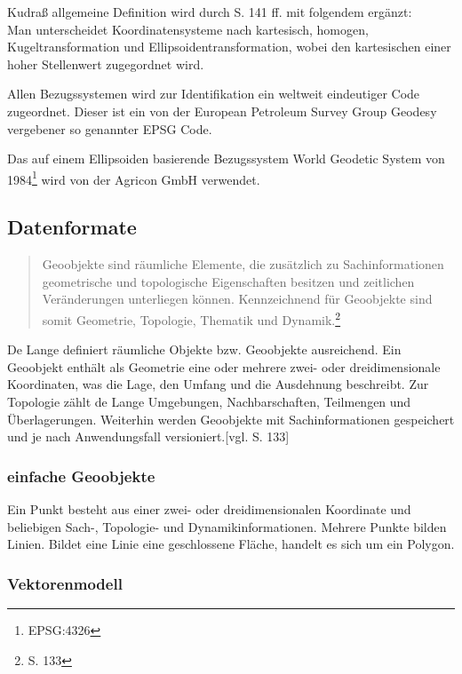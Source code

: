 Kudraß allgemeine Definition wird durch \cite{book:gi-theopluspraxis3} S. 141 ff. mit folgendem ergänzt:\\
Man unterscheidet Koordinatensysteme nach kartesisch, homogen, Kugeltransformation und Ellipsoidentransformation, wobei den kartesischen einer hoher Stellenwert zugegordnet wird.

Allen Bezugssystemen wird zur Identifikation ein weltweit eindeutiger Code zugeordnet.
Dieser ist ein von der European Petroleum Survey Group Geodesy vergebener so genannter EPSG Code.

Das auf einem Ellipsoiden basierende Bezugssystem World Geodetic System von 1984\footnote{EPSG:4326} wird von der Agricon GmbH verwendet.


\subsection{Datenformate}


\begin{quote}
Geoobjekte sind räumliche Elemente, die zusätzlich zu Sachinformationen geometrische und topologische Eigenschaften besitzen und zeitlichen Veränderungen unterliegen können. Kennzeichnend für Geoobjekte sind somit Geometrie, Topologie, Thematik und Dynamik.\footnote{\cite{book:gi-theopluspraxis3} S. 133}
\end{quote}
De Lange definiert räumliche Objekte bzw. Geoobjekte ausreichend.
Ein Geoobjekt enthält als Geometrie eine oder mehrere zwei- oder dreidimensionale Koordinaten, was die Lage, den Umfang und die Ausdehnung beschreibt.
Zur Topologie zählt de Lange Umgebungen, Nachbarschaften, Teilmengen und Überlagerungen.
Weiterhin werden Geoobjekte mit Sachinformationen gespeichert und je nach Anwendungsfall versioniert.[vgl. \cite{book:gi-theopluspraxis3} S. 133]


\subsubsection{einfache Geoobjekte}

Ein Punkt besteht aus einer zwei- oder dreidimensionalen Koordinate und beliebigen Sach-, Topologie- und Dynamikinformationen.
Mehrere Punkte bilden Linien.
Bildet eine Linie eine geschlossene Fläche, handelt es sich um ein Polygon.

\subsubsection{Vektorenmodell}

